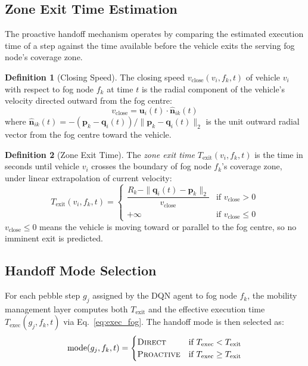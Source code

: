 \documentclass[12pt,a4paper]{article}
\theoremstyle{definition}
\newtheorem{definition}{Definition}[section]
\theoremstyle{remark}
\begin{document}
\subsection{Zone Exit Time Estimation}

The proactive handoff mechanism operates by comparing the estimated
execution time of a step against the time available before the vehicle
exits the serving fog node's coverage zone.

\begin{definition}[Closing Speed]
The closing speed $v_{\text{close}}(v_i, f_k, t)$ of vehicle $v_i$ with
respect to fog node $f_k$ at time $t$ is the radial component of the
vehicle's velocity directed outward from the fog centre:
\begin{equation}
  v_{\text{close}} =
  \bm{u}_i(t) \cdot \hat{\bm{n}}_{ik}(t)
  \label{eq:v_close}
\end{equation}
where $\hat{\bm{n}}_{ik}(t) = -(\bm{p}_k - \bm{q}_i(t)) /
\|\bm{p}_k - \bm{q}_i(t)\|_2$ is the unit outward radial vector
from the fog centre toward the vehicle.
\end{definition}

\begin{definition}[Zone Exit Time]
The \emph{zone exit time} $T_{\text{exit}}(v_i, f_k, t)$ is the time in
seconds until vehicle $v_i$ crosses the boundary of fog node $f_k$'s
coverage zone, under linear extrapolation of current velocity:
\begin{equation}
  T_{\text{exit}}(v_i, f_k, t) =
  \begin{cases}
    \dfrac{R_k - \|\bm{q}_i(t) - \bm{p}_k\|_2}{v_{\text{close}}}
    & \text{if } v_{\text{close}} > 0 \\[8pt]
    +\infty & \text{if } v_{\text{close}} \leq 0
  \end{cases}
  \label{eq:texit}
\end{equation}
$v_{\text{close}} \leq 0$ means the vehicle is moving toward or parallel
to the fog centre, so no imminent exit is predicted.
\end{definition}

\subsection{Handoff Mode Selection}

For each pebble step $g_j$ assigned by the DQN agent to fog node $f_k$,
the mobility management layer computes both $T_{\text{exit}}$ and the
effective execution time $T_{\text{exec}}(g_j, f_k, t)$ via
Eq.~\eqref{eq:exec_fog}. The handoff mode is then selected as:
\begin{equation}
  \mathrm{mode}(g_j, f_k, t) =
  \begin{cases}
    \textsc{Direct}     & \text{if } T_{\text{exec}} < T_{\text{exit}} \\
    \textsc{Proactive}  & \text{if } T_{\text{exec}} \geq T_{\text{exit}}
  \end{cases}
  \label{eq:mode}
\end{equation}
\end{document}
